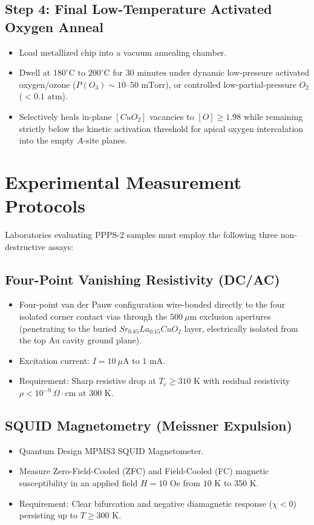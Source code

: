\documentclass[10pt,twocolumn,letterpaper]{article}
\begin{document}
\subsection{Step 4: Final Low-Temperature Activated Oxygen Anneal}
\begin{itemize}
    \item Load metallized chip into a vacuum annealing chamber.
    \item Dwell at \textbf{$180^\circ\text{C}\text{ to }200^\circ\text{C}$} for $30\text{ minutes}$ under dynamic low-pressure activated oxygen/ozone ($P(O_3) \sim 10\text{--}50\text{ mTorr}$), or controlled low-partial-pressure $O_2$ ($<0.1\text{ atm}$).
    \item Selectively heals in-plane $[CuO_2]$ vacancies to $[O] \ge 1.98$ while remaining strictly below the kinetic activation threshold for apical oxygen intercalation into the empty $A$-site planes.
\end{itemize}

\section{Experimental Measurement Protocols}

Laboratories evaluating PPPS-2 samples must employ the following three non-destructive assays:

\subsection{Four-Point Vanishing Resistivity (DC/AC)}
\begin{itemize}
    \item Four-point van der Pauw configuration wire-bonded directly to the four isolated corner contact vias through the $500\ \mu\text{m}$ exclusion apertures (penetrating to the buried $Sr_{0.85}La_{0.15}CuO_2$ layer, electrically isolated from the top Au cavity ground plane).
    \item Excitation current: $I = 10\ \mu\text{A}$ to $1\text{ mA}$.
    \item Requirement: Sharp resistive drop at $T_c \ge 310\text{ K}$ with residual resistivity $\rho < 10^{-9}\ \Omega\cdot\text{cm}$ at $300\text{ K}$.
\end{itemize}

\subsection{SQUID Magnetometry (Meissner Expulsion)}
\begin{itemize}
    \item Quantum Design MPMS3 SQUID Magnetometer.
    \item Measure Zero-Field-Cooled (ZFC) and Field-Cooled (FC) magnetic susceptibility in an applied field $H = 10\text{ Oe}$ from $10\text{ K}$ to $350\text{ K}$.
    \item Requirement: Clear bifurcation and negative diamagnetic response ($\chi < 0$) persisting up to $T \ge 300\text{ K}$.
\end{itemize}
\end{document}
